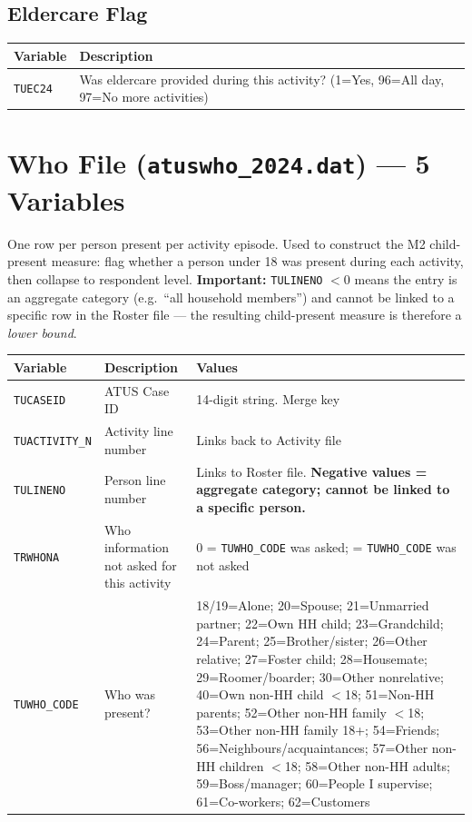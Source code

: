 \documentclass[11pt, a4paper]{article}
\begin{document}
\subsection{Eldercare Flag}
\begin{longtable}{L{3.5cm} L{12cm}}
\toprule \textbf{Variable} & \textbf{Description} \\ \midrule \endhead
\bottomrule \endfoot
\texttt{TUEC24} & Was eldercare provided during this activity?
                  (1=Yes, 96=All day, 97=No more activities) \\
\end{longtable}

\newpage
\section{Who File (\texttt{atuswho\_2024.dat}) --- 5 Variables}

\begin{tcolorbox}[notebox]
One row per person present per activity episode. Used to construct the M2
child-present measure: flag whether a person under 18 was present during
each activity, then collapse to respondent level. \textbf{Important:}
\texttt{TULINENO} $< 0$ means the entry is an aggregate category
(e.g.\ ``all household members'') and cannot be linked to a specific row in
the Roster file --- the resulting child-present measure is therefore a
\emph{lower bound}.
\end{tcolorbox}
\vspace{1mm}

\begin{longtable}{L{2.8cm} L{4.4cm} L{8cm}}
\toprule
\textbf{Variable} & \textbf{Description} & \textbf{Values} \\
\midrule \endhead \bottomrule \endfoot
\texttt{TUCASEID}      & ATUS Case ID & 14-digit string. Merge key \\
 \texttt{TUACTIVITY\_N} & Activity line number &
  Links back to Activity file \\
\texttt{TULINENO}      & Person line number &
  Links to Roster file. \textbf{Negative values = aggregate category;
  cannot be linked to a specific person.} \\
 \texttt{TRWHONA}       & Who information not asked for this activity &
  0 = \texttt{TUWHO\_CODE} was asked; = \texttt{TUWHO\_CODE} was not asked \\
\texttt{TUWHO\_CODE}   & Who was present? &
  18/19=Alone; 20=Spouse; 21=Unmarried partner; 22=Own HH child;
  23=Grandchild; 24=Parent; 25=Brother/sister; 26=Other relative;
  27=Foster child; 28=Housemate; 29=Roomer/boarder;
  30=Other nonrelative; 40=Own non-HH child $<$18;
  51=Non-HH parents; 52=Other non-HH family $<$18;
  53=Other non-HH family 18+; 54=Friends;
  56=Neighbours/acquaintances; 57=Other non-HH children $<$18;
  58=Other non-HH adults; 59=Boss/manager;
  60=People I supervise; 61=Co-workers; 62=Customers \\
\end{longtable}
\end{document}
